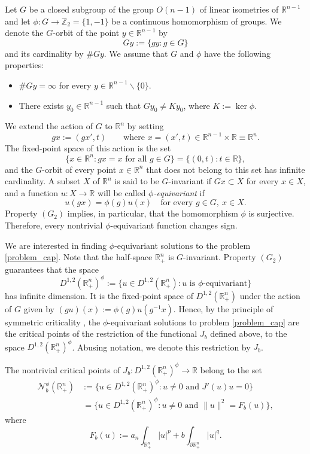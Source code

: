 \documentclass[reqno,11pt,oneside]{amsart}
\numberwithin{equation}{section}
\def\r{\mathbb{R}}
\def\rn{\mathbb{R}^n}
\def\hn{\mathbb{R}^n_+}
\def\ihn{\int_{\hn}}
\def\idhn{\int_{\partial\hn}}
\def\cN{\mathcal{N}}
\begin{document}
Let $G$ be a closed subgroup of the group $O(n-1)$ of linear isometries of $\r^{n-1}$ and let $\phi:G\to\mathbb{Z}_2=\{1,-1\}$ be a continuous homomorphism of groups. We denote the $G$-orbit of the point $y\in\r^{n-1}$ by
$$Gy:=\{gy:g\in G\}$$
and its cardinality by $\# Gy$. We assume that $G$ and $\phi$ have the following properties:
\begin{itemize}
\item[$(G_1)$] $\# Gy=\infty$ for every $y\in\r^{n-1}\smallsetminus\{0\}$.
\item[$(G_2)$] There exists $y_0\in\r^{n-1}$ such that $Gy_0\neq Ky_0$, where $K:=\ker\phi$.
\end{itemize}
We extend the action of $G$ to $\rn$ by setting
$$gx:=(gx',t)\qquad\text{where \ }x=(x',t)\in\r^{n-1}\times\r\equiv\rn.$$
The fixed-point space of this action is the set
$$\{x\in\rn:gx=x\text{ \ for all \ }g\in G\}=\{(0,t):t\in\r\},$$
and the $G$-orbit of every point $x\in\rn$ that does not belong to this set has infinite cardinality. A subset $X$ of $\rn$ is said to be $G$-invariant if $Gx\subset X$ for every $x\in X$, and a function $u:X\to\r$ will be called \emph{$\phi$-equivariant} if 
\begin{equation}
u(gx)=\phi(g)u(x)\quad\text{for every \ }g\in G, \ x\in X.
\end{equation}
Property $(G_2)$ implies, in particular, that the homomorphism $\phi$ is surjective. Therefore, every nontrivial $\phi$-equivariant function changes sign. 

We are interested in finding $\phi$-equivariant solutions to the problem \eqref{problem_cap}. Note that the half-space $\hn$ is $G$-invariant. Property $(G_2)$ guarantees that the space
$$D^{1,2}(\hn)^\phi:=\{u\in D^{1,2}(\hn):u\text{ \ is \ }\phi\text{-equivariant}\}$$
has infinite dimension. It is the fixed-point space of $D^{1,2}(\hn)$ under the action of $G$ given by $(gu)(x):=\phi(g)u(g^{-1}x)$. Hence, by the principle of symmetric criticality \cite[Theorem 1.28]{w}, the $\phi$-equivariant solutions to problem \eqref{problem_cap} are the critical points of the restriction of the functional $J_b$ defined above, to the space $D^{1,2}(\hn)^\phi$. Abusing notation, we denote this restriction by $J_b$.

The nontrivial critical points of $J_b:D^{1,2}(\hn)^\phi\to\r$ belong to the set
\begin{align*}
\cN_b^\phi(\hn)&:=\{u\in D^{1,2}(\hn)^\phi: u\neq 0 \text{ and }J'(u)u=0\} \\
&\,=\Big\{u\in D^{1,2}(\hn)^\phi: u\neq 0 \text{ and }\|u\|^2=F_b(u)\Big\},
\end{align*}
where 
\begin{equation}\label{eq:F}
F_b(u):=a_n\ihn |u|^p + b\idhn|u|^q.
\end{equation}
\end{document}
